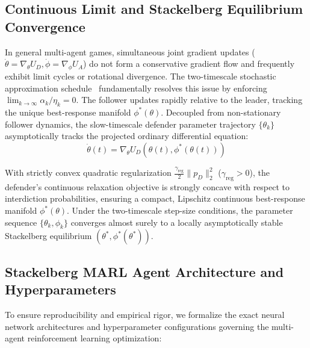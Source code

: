\subsection{Continuous Limit and Stackelberg Equilibrium Convergence}
In general multi-agent games, simultaneous joint gradient updates ($\dot{\theta} = \nabla_\theta U_D, \dot{\phi} = \nabla_\phi U_A$) do not form a conservative gradient flow and frequently exhibit limit cycles or rotational divergence. The two-timescale stochastic approximation schedule~\cite{borkar2008stochastic} fundamentally resolves this issue by enforcing $\lim_{k \to \infty} \alpha_k / \eta_k = 0$. The follower updates rapidly relative to the leader, tracking the unique best-response manifold $\phi^*(\theta)$. Decoupled from non-stationary follower dynamics, the slow-timescale defender parameter trajectory $\{\theta_k\}$ asymptotically tracks the projected ordinary differential equation:
\begin{equation}
\dot{\theta}(t) = \nabla_\theta U_D(\theta(t), \phi^*(\theta(t)))
\end{equation}

\begin{theorem}
With strictly convex quadratic regularization $\frac{\gamma_{\text{reg}}}{2} \|p_D\|_2^2$ ($\gamma_{\text{reg}} > 0$), the defender's continuous relaxation objective is strongly concave with respect to interdiction probabilities, ensuring a compact, Lipschitz continuous best-response manifold $\phi^*(\theta)$. Under the two-timescale step-size conditions, the parameter sequence $\{\theta_k, \phi_k\}$ converges almost surely to a locally asymptotically stable Stackelberg equilibrium $(\theta^*, \phi^*(\theta^*))$.
\end{theorem}

\subsection{Stackelberg MARL Agent Architecture and Hyperparameters}
\label{sec:marl_architecture}
To ensure reproducibility and empirical rigor, we formalize the exact neural network architectures and hyperparameter configurations governing the multi-agent reinforcement learning optimization:

